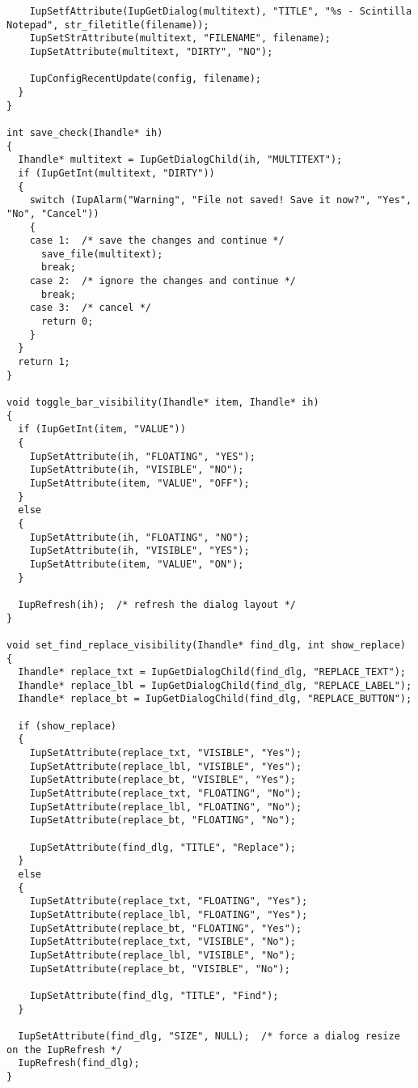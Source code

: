 \documentclass{ctexart}
\begin{document}
\begin{lstlisting}
    IupSetfAttribute(IupGetDialog(multitext), "TITLE", "%s - Scintilla Notepad", str_filetitle(filename));
    IupSetStrAttribute(multitext, "FILENAME", filename);
    IupSetAttribute(multitext, "DIRTY", "NO");

    IupConfigRecentUpdate(config, filename);
  }
}

int save_check(Ihandle* ih)
{
  Ihandle* multitext = IupGetDialogChild(ih, "MULTITEXT");
  if (IupGetInt(multitext, "DIRTY"))
  {
    switch (IupAlarm("Warning", "File not saved! Save it now?", "Yes", "No", "Cancel"))
    {
    case 1:  /* save the changes and continue */
      save_file(multitext);
      break;
    case 2:  /* ignore the changes and continue */
      break;
    case 3:  /* cancel */
      return 0;
    }
  }
  return 1;
}

void toggle_bar_visibility(Ihandle* item, Ihandle* ih)
{
  if (IupGetInt(item, "VALUE"))
  {
    IupSetAttribute(ih, "FLOATING", "YES");
    IupSetAttribute(ih, "VISIBLE", "NO");
    IupSetAttribute(item, "VALUE", "OFF");
  }
  else
  {
    IupSetAttribute(ih, "FLOATING", "NO");
    IupSetAttribute(ih, "VISIBLE", "YES");
    IupSetAttribute(item, "VALUE", "ON");
  }

  IupRefresh(ih);  /* refresh the dialog layout */
}

void set_find_replace_visibility(Ihandle* find_dlg, int show_replace)
{
  Ihandle* replace_txt = IupGetDialogChild(find_dlg, "REPLACE_TEXT");
  Ihandle* replace_lbl = IupGetDialogChild(find_dlg, "REPLACE_LABEL");
  Ihandle* replace_bt = IupGetDialogChild(find_dlg, "REPLACE_BUTTON");

  if (show_replace)
  {
    IupSetAttribute(replace_txt, "VISIBLE", "Yes");
    IupSetAttribute(replace_lbl, "VISIBLE", "Yes");
    IupSetAttribute(replace_bt, "VISIBLE", "Yes");
    IupSetAttribute(replace_txt, "FLOATING", "No");
    IupSetAttribute(replace_lbl, "FLOATING", "No");
    IupSetAttribute(replace_bt, "FLOATING", "No");

    IupSetAttribute(find_dlg, "TITLE", "Replace");
  }
  else
  {
    IupSetAttribute(replace_txt, "FLOATING", "Yes");
    IupSetAttribute(replace_lbl, "FLOATING", "Yes");
    IupSetAttribute(replace_bt, "FLOATING", "Yes");
    IupSetAttribute(replace_txt, "VISIBLE", "No");
    IupSetAttribute(replace_lbl, "VISIBLE", "No");
    IupSetAttribute(replace_bt, "VISIBLE", "No");

    IupSetAttribute(find_dlg, "TITLE", "Find");
  }

  IupSetAttribute(find_dlg, "SIZE", NULL);  /* force a dialog resize on the IupRefresh */
  IupRefresh(find_dlg);
}



\end{lstlisting}
\end{document}
